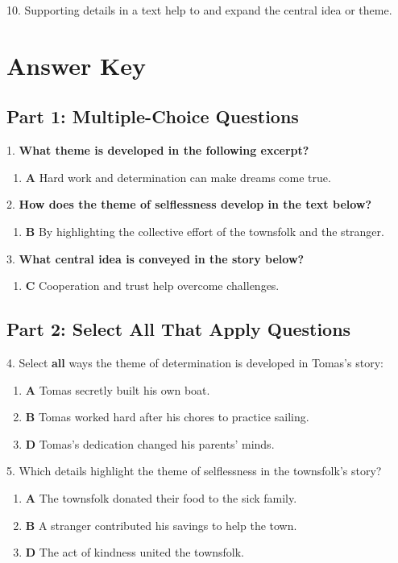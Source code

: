 \documentclass[12pt]{article}
\begin{document}
10. Supporting details in a text help to \underline{\hspace{4cm}} and expand the central idea or theme.  
\vspace{2cm}
\newpage
\section*{Answer Key}

\subsection*{Part 1: Multiple-Choice Questions}

1. \textbf{What theme is developed in the following excerpt?}
\begin{enumerate}[label=\Alph*.]
    \item \textbf{A} Hard work and determination can make dreams come true.
\end{enumerate}

2. \textbf{How does the theme of selflessness develop in the text below?}
\begin{enumerate}[label=\Alph*.]
    \item \textbf{B} By highlighting the collective effort of the townsfolk and the stranger.
\end{enumerate}

3. \textbf{What central idea is conveyed in the story below?}
\begin{enumerate}[label=\Alph*.]
    \item \textbf{C} Cooperation and trust help overcome challenges.
\end{enumerate}

\subsection*{Part 2: Select All That Apply Questions}

4. Select \textbf{all} ways the theme of determination is developed in Tomas’s story:
\begin{enumerate}[label=\Alph*.]
    \item \textbf{A} Tomas secretly built his own boat.
    \item \textbf{B} Tomas worked hard after his chores to practice sailing.
    \item \textbf{D} Tomas’s dedication changed his parents’ minds.
\end{enumerate}

5. Which details highlight the theme of selflessness in the townsfolk’s story?
\begin{enumerate}[label=\Alph*.]
    \item \textbf{A} The townsfolk donated their food to the sick family.
    \item \textbf{B} A stranger contributed his savings to help the town.
    \item \textbf{D} The act of kindness united the townsfolk.
\end{enumerate}
\end{document}
